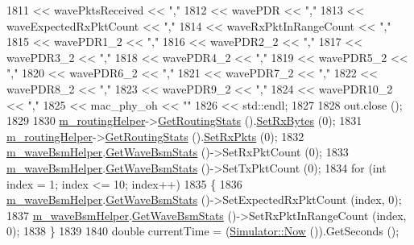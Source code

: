 \begin{DoxyCode}
1811       << wavePktsReceived << \textcolor{stringliteral}{","}
1812       << wavePDR << \textcolor{stringliteral}{","}
1813       << waveExpectedRxPktCount << \textcolor{stringliteral}{","}
1814       << waveRxPktInRangeCount << \textcolor{stringliteral}{","}
1815       << wavePDR1\_2 << \textcolor{stringliteral}{","}
1816       << wavePDR2\_2 << \textcolor{stringliteral}{","}
1817       << wavePDR3\_2 << \textcolor{stringliteral}{","}
1818       << wavePDR4\_2 << \textcolor{stringliteral}{","}
1819       << wavePDR5\_2 << \textcolor{stringliteral}{","}
1820       << wavePDR6\_2 << \textcolor{stringliteral}{","}
1821       << wavePDR7\_2 << \textcolor{stringliteral}{","}
1822       << wavePDR8\_2 << \textcolor{stringliteral}{","}
1823       << wavePDR9\_2 << \textcolor{stringliteral}{","}
1824       << wavePDR10\_2 << \textcolor{stringliteral}{","}
1825       << mac\_phy\_oh << \textcolor{stringliteral}{""}
1826       << std::endl;
1827 
1828   out.close ();
1829 
1830   \hyperlink{classVanetRoutingExperiment_afbd666dc1310ae1903438ab9073409d5}{m\_routingHelper}->\hyperlink{classRoutingHelper_ae3bfcf80989af6e77fa131d5787302c5}{GetRoutingStats} ().\hyperlink{classRoutingStats_af83449b8cc9a2fe9794db8c6b56f1ef9}{SetRxBytes} (0);
1831   \hyperlink{classVanetRoutingExperiment_afbd666dc1310ae1903438ab9073409d5}{m\_routingHelper}->\hyperlink{classRoutingHelper_ae3bfcf80989af6e77fa131d5787302c5}{GetRoutingStats} ().\hyperlink{classRoutingStats_a58ba0c95aeabe1d060ee854f97fe2dba}{SetRxPkts} (0);
1832   \hyperlink{classVanetRoutingExperiment_a690b550804fc4c9bcfab6b8ae40e4728}{m\_waveBsmHelper}.\hyperlink{classns3_1_1WaveBsmHelper_a7b7442d597cc104a22c8c4bef6c98c6e}{GetWaveBsmStats} ()->SetRxPktCount (0);
1833   \hyperlink{classVanetRoutingExperiment_a690b550804fc4c9bcfab6b8ae40e4728}{m\_waveBsmHelper}.\hyperlink{classns3_1_1WaveBsmHelper_a7b7442d597cc104a22c8c4bef6c98c6e}{GetWaveBsmStats} ()->SetTxPktCount (0);
1834   \textcolor{keywordflow}{for} (\textcolor{keywordtype}{int} index = 1; index <= 10; index++)
1835     \{
1836       \hyperlink{classVanetRoutingExperiment_a690b550804fc4c9bcfab6b8ae40e4728}{m\_waveBsmHelper}.\hyperlink{classns3_1_1WaveBsmHelper_a7b7442d597cc104a22c8c4bef6c98c6e}{GetWaveBsmStats} ()->SetExpectedRxPktCount (index, 0);
1837       \hyperlink{classVanetRoutingExperiment_a690b550804fc4c9bcfab6b8ae40e4728}{m\_waveBsmHelper}.\hyperlink{classns3_1_1WaveBsmHelper_a7b7442d597cc104a22c8c4bef6c98c6e}{GetWaveBsmStats} ()->SetRxPktInRangeCount (index, 0);
1838     \}
1839 
1840   \textcolor{keywordtype}{double} currentTime = (\hyperlink{group__simulator_gac3635e2e87f7ce316c89290ee1b01d0d}{Simulator::Now} ()).GetSeconds ();

\end{DoxyCode}
